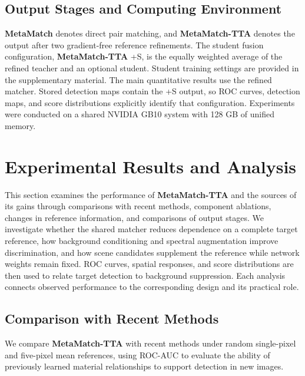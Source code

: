 \documentclass[a4paper,11pt]{article}
\newcommand{\method}{\textbf{MetaMatch-TTA}}
\newcommand{\matcher}{\textbf{MetaMatch}}
\begin{document}
\subsection{Output Stages and Computing Environment}
\matcher{} denotes direct pair matching, and \method{} denotes the output after two gradient-free reference refinements. The student fusion configuration, \method{} +S, is the equally weighted average of the refined teacher and an optional student. Student training settings are provided in the supplementary material. The main quantitative results use the refined matcher. Stored detection maps contain the +S output, so ROC curves, detection maps, and score distributions explicitly identify that configuration. Experiments were conducted on a shared NVIDIA GB10 system with 128 GB of unified memory.
\FloatBarrier

\section{Experimental Results and Analysis}\label{sec:results}
This section examines the performance of \method{} and the sources of its gains through comparisons with recent methods, component ablations, changes in reference information, and comparisons of output stages. We investigate whether the shared matcher reduces dependence on a complete target reference, how background conditioning and spectral augmentation improve discrimination, and how scene candidates supplement the reference while network weights remain fixed. ROC curves, spatial responses, and score distributions are then used to relate target detection to background suppression. Each analysis connects observed performance to the corresponding design and its practical role.

\subsection{Comparison with Recent Methods}\label{sec:recent}
We compare \method{} with recent methods under random single-pixel and five-pixel mean references, using ROC-AUC to evaluate the ability of previously learned material relationships to support detection in new images.
\end{document}
